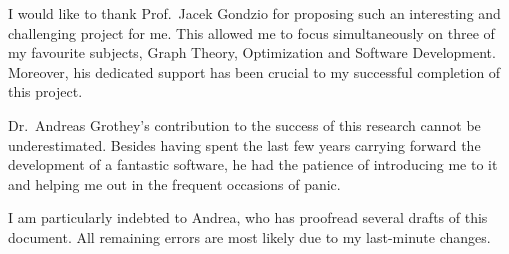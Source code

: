 
%
%

I would like to thank Prof.~Jacek Gondzio for proposing such an interesting and challenging project for me. This allowed me to focus simultaneously on three of my  favourite subjects, Graph Theory, Optimization and Software Development. Moreover, his dedicated support has been crucial to my successful completion of this project.

Dr.~Andreas Grothey's contribution to the success of this research cannot be underestimated. Besides having spent the last few years carrying forward the development of a fantastic software, he had the patience of introducing me to it and helping me out in the frequent occasions of panic.

I am particularly indebted to Andrea, who has proofread several drafts of this document. All remaining errors are most likely due to my last-minute changes.

